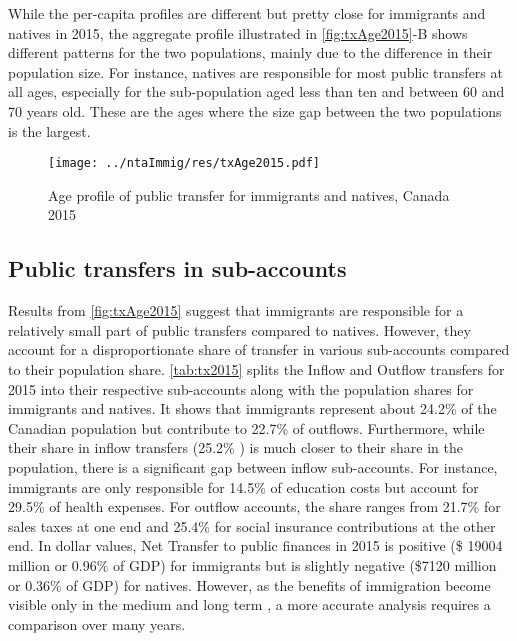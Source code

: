 \vspace{0.7em}\par
While the per-capita profiles are different but pretty close for immigrants and natives in 2015, the aggregate profile illustrated in \autoref{fig:txAge2015}-B shows different patterns for the two populations, mainly due to the difference in their population size.
For instance, natives are responsible for most public transfers at all ages, especially for the sub-population aged less than ten and between 60 and 70 years old. These are the ages where the size gap between the two populations is the largest.

\begin{figure}[H]%
  \caption{Age profile of public transfer for immigrants and natives, Canada 2015}
  \texttt{[image: ../ntaImmig/res/txAge2015.pdf]}%
  \label{fig:txAge2015}%
\end{figure}%

\subsection{Public transfers in sub-accounts}
Results from \autoref{fig:txAge2015} suggest that immigrants are responsible for a relatively small part of public transfers compared to natives.
However, they account for a disproportionate share of transfer in various sub-accounts compared to their population share.
\autoref{tab:tx2015} splits the Inflow and Outflow transfers for 2015 into their respective sub-accounts along with the population shares for immigrants and natives.
It shows that immigrants represent about 24.2\% of the Canadian population but contribute to 22.7\% of outflows.
Furthermore, while their share in inflow transfers (25.2\% ) is much closer to their share in the population, there is a significant gap between inflow sub-accounts.
For instance, immigrants are only responsible for 14.5\% of education costs but account for 29.5\% of health expenses.
For outflow accounts, the share ranges from 21.7\% for sales taxes at one end and 25.4\% for social insurance contributions at the other end.
In dollar values, Net Transfer to public finances in 2015 is positive (\$ \num{19004} million or 0.96\% of GDP) for immigrants but is slightly negative (\$\num{7120} million or 0.36\% of GDP) for natives.
However, as the benefits of immigration become visible only in the medium and long term \citep{Goldin:2011tg}, a more accurate analysis requires a comparison over many years.


